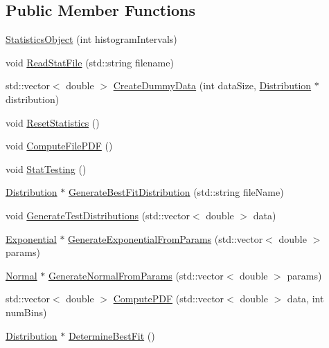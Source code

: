 \subsection*{Public Member Functions}
\begin{DoxyCompactItemize}
\item 
\hyperlink{class_statistics_object_ad4893d12c42f2bfdcab96f4246750556}{Statistics\+Object} (int histogram\+Intervals)
\item 
void \hyperlink{class_statistics_object_a693fe5171d536953cc5545048716dcca}{Read\+Stat\+File} (std\+::string filename)
\item 
std\+::vector$<$ double $>$ \hyperlink{class_statistics_object_a8177bcf97b01750d125852b888e11323}{Create\+Dummy\+Data} (int data\+Size, \hyperlink{class_distribution}{Distribution} $\ast$distribution)
\item 
void \hyperlink{class_statistics_object_aafceb8d5caaffc3482e5f9be760fc953}{Reset\+Statistics} ()
\item 
void \hyperlink{class_statistics_object_a7954e7f69391099bbc33c139149ebb15}{Compute\+File\+P\+DF} ()
\item 
void \hyperlink{class_statistics_object_a9545eace92c4a478cf20dba20f8e51bf}{Stat\+Testing} ()
\item 
\hyperlink{class_distribution}{Distribution} $\ast$ \hyperlink{class_statistics_object_a88d8c8b8fd57da4a08cf1d02d363abf1}{Generate\+Best\+Fit\+Distribution} (std\+::string file\+Name)
\item 
void \hyperlink{class_statistics_object_a7efac97d5d339216bb81bd361419799d}{Generate\+Test\+Distributions} (std\+::vector$<$ double $>$ data)
\item 
\hyperlink{class_exponential}{Exponential} $\ast$ \hyperlink{class_statistics_object_a850dc5ba25d9017f5a586ba2ffd64d94}{Generate\+Exponential\+From\+Params} (std\+::vector$<$ double $>$ params)
\item 
\hyperlink{class_normal}{Normal} $\ast$ \hyperlink{class_statistics_object_a59cffa517dbb293e1f8fe72f2e6dd34f}{Generate\+Normal\+From\+Params} (std\+::vector$<$ double $>$ params)
\item 
std\+::vector$<$ double $>$ \hyperlink{class_statistics_object_ad89d69d36051851fe876b1ec28967c1e}{Compute\+P\+DF} (std\+::vector$<$ double $>$ data, int num\+Bins)
\item 
\hyperlink{class_distribution}{Distribution} $\ast$ \hyperlink{class_statistics_object_a13305945c9536243f926b61d554c2dd4}{Determine\+Best\+Fit} ()
\item 

\end{DoxyCompactItemize}
